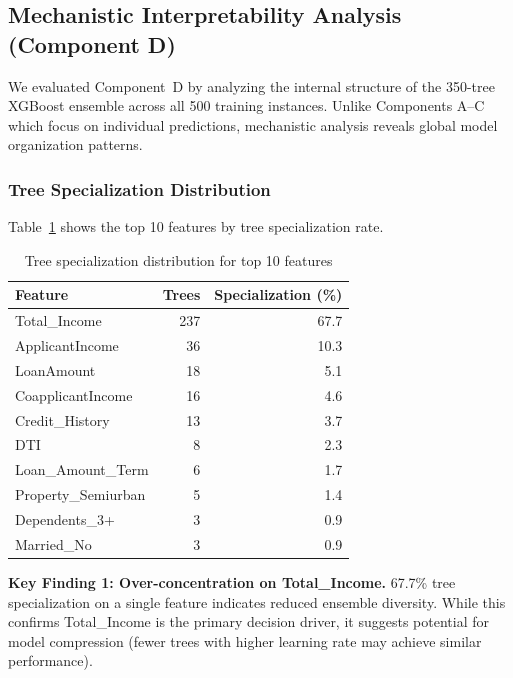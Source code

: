 
\subsection{Mechanistic Interpretability Analysis (Component D)}

We evaluated Component~D by analyzing the internal structure of the 350-tree XGBoost ensemble across all 500 training instances. Unlike Components A--C which focus on individual predictions, mechanistic analysis reveals global model organization patterns.

\subsubsection{Tree Specialization Distribution}

Table~\ref{tab:tree_specialization} shows the top 10 features by tree specialization rate.

\begin{table}[htp]
\caption{Tree specialization distribution for top 10 features}
\label{tab:tree_specialization}
\centering
\begin{tabular}{lrr}
\toprule
\textbf{Feature} & \textbf{Trees} & \textbf{Specialization (\%)} \\
\midrule
Total\_Income        & 237 & 67.7 \\
ApplicantIncome      & 36  & 10.3 \\
LoanAmount           & 18  & 5.1  \\
CoapplicantIncome    & 16  & 4.6  \\
Credit\_History      & 13  & 3.7  \\
DTI                  & 8   & 2.3  \\
Loan\_Amount\_Term   & 6   & 1.7  \\
Property\_Semiurban  & 5   & 1.4  \\
Dependents\_3+       & 3   & 0.9  \\
Married\_No          & 3   & 0.9  \\
\bottomrule
\end{tabular}
\end{table}

\textbf{Key Finding 1: Over-concentration on Total\_Income.}
67.7\% tree specialization on a single feature indicates reduced ensemble diversity. While this confirms Total\_Income is the primary decision driver, it suggests potential for model compression (fewer trees with higher learning rate may achieve similar performance).

